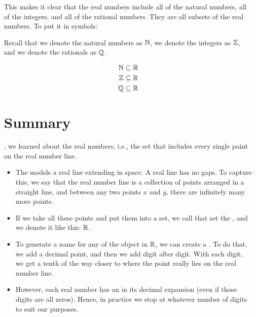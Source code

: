 \documentclass[../../../main.tex]{subfiles}
\begin{document}
This makes it clear that the real numbers include all of the natural numbers, all of the integers, and all of the rational numbers. They are all subsets of the real numbers. To put it in symbols:

\begin{aside}
  \begin{remark}
    Recall that we denote the natural numbers as $\Nats/$, we denote the integers as $\Ints/$, and we denote the rationals as $\Rationals/$.
  \end{remark}
\end{aside}

\begin{align*}
  \Nats/ &\subseteq \Reals/ \\
  \Ints/ &\subseteq \Reals/ \\
  \Rationals/ &\subseteq \Reals/
\end{align*}


\section{Summary}

, we learned about the real numbers, i.e., the set that includes every single point on the real number line.

\begin{itemize}

  \item The  models a real line extending in space. A real line has no gaps. To capture this, we say that the real number line is a collection of points arranged in a straight line, and between any two points $x$ and $y$, there are infinitely many more points.
  
  \item If we take all these points and put them into a set, we call that set the , and we denote it like this: $\Reals/$.
  
  \item To generate a name for any of the object in $\Reals/$, we can create a . To do that, we add a decimal point, and then we add digit after digit. With each digit, we get a tenth of the way closer to where the point really lies on the real number line.
  
  \item However, each real number has an  in its decimal expansion (even if those digits are all zeros). Hence, in practice we stop at whatever number of digits  to suit our purposes.

\end{itemize}
\end{document}
